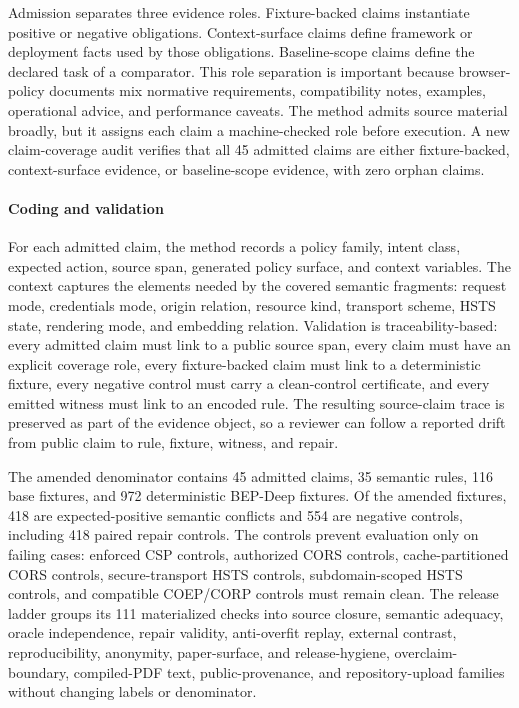 \documentclass[10pt,conference]{IEEEtran}
\begin{document}
Admission separates three evidence roles. Fixture-backed claims instantiate positive or negative obligations. Context-surface claims define framework or deployment facts used by those obligations. Baseline-scope claims define the declared task of a comparator. This role separation is important because browser-policy documents mix normative requirements, compatibility notes, examples, operational advice, and performance caveats. The method admits source material broadly, but it assigns each claim a machine-checked role before execution. A new claim-coverage audit verifies that all 45 admitted claims are either fixture-backed, context-surface evidence, or baseline-scope evidence, with zero orphan claims.

\paragraph{Coding and validation}

For each admitted claim, the method records a policy family, intent class, expected action, source span, generated policy surface, and context variables. The context captures the elements needed by the covered semantic fragments: request mode, credentials mode, origin relation, resource kind, transport scheme, HSTS state, rendering mode, and embedding relation. Validation is traceability-based: every admitted claim must link to a public source span, every claim must have an explicit coverage role, every fixture-backed claim must link to a deterministic fixture, every negative control must carry a clean-control certificate, and every emitted witness must link to an encoded rule. The resulting source-claim trace is preserved as part of the evidence object, so a reviewer can follow a reported drift from public claim to rule, fixture, witness, and repair.

The amended denominator contains 45 admitted claims, 35 semantic rules, 116 base fixtures, and 972 deterministic BEP-Deep fixtures. Of the amended fixtures, 418 are expected-positive semantic conflicts and 554 are negative controls, including 418 paired repair controls. The controls prevent evaluation only on failing cases: enforced CSP controls, authorized CORS controls, cache-partitioned CORS controls, secure-transport HSTS controls, subdomain-scoped HSTS controls, and compatible COEP/CORP controls must remain clean. The release ladder groups its 111 materialized checks into source closure, semantic adequacy, oracle independence, repair validity, anti-overfit replay, external contrast, reproducibility, anonymity, paper-surface, and release-hygiene, overclaim-boundary, compiled-PDF text, public-provenance, and repository-upload families without changing labels or denominator.
\end{document}
